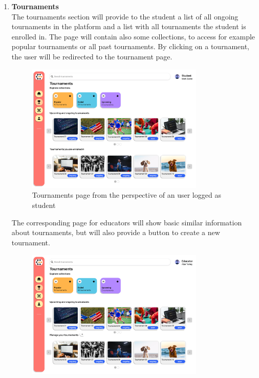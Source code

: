 \begin{enumerate}[label=\textbf{F\arabic*)}]
    \item \textbf{Tournaments}\\
    The tournaments section will provide to the student a list of all ongoing tournaments in the platform and a list with all tournaments the student is enrolled in. The page will contain also some collections, to access for example popular tournaments or all past tournaments. By clicking on a tournament, the user will be redirected to the tournament page.\\ 
    \begin{figure}[H]
        \centering
        \includegraphics[width=0.8\textwidth]{Mockups/4_student_tournaments.png}
        \caption{Tournaments page from the perspective of an user logged as student}
    \end{figure}
    The corresponding page for educators will show basic similar information about tournaments, but will also provide a button to create a new tournament.\\
    \begin{figure}[H]
        \centering
        \includegraphics[width=0.8\textwidth]{Mockups/5_educator_tournaments.png}

\end{figure}
\end{enumerate}
